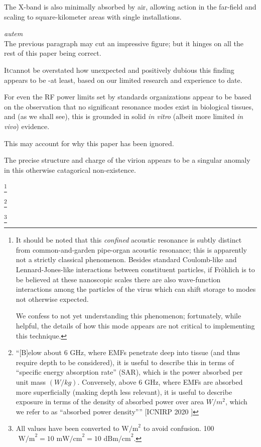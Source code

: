 \documentclass[fleqn,10pt]{article}
\begin{document}
\begin{multicols}{1}
The X-band is also minimally absorbed by air, allowing action in the far-field and scaling to square-kilometer areas with single installations.

\begin{autem}

{\it autem}\\
The previous paragraph may cut an impressive figure; but it hinges on all the rest of this paper being correct.

\end{autem}

\lettrine{It} cannot be overstated how unexpected and positively dubious this finding appears to be -at least, based on our limited research and experience to date.

For even the RF power limits set by standards organizations appear to be based on the observation that no significant resonance modes exist in biological tissues, and (as we shall see), this is grounded in solid {\it in vitro} (albeit more limited {\it in vivo}) evidence. 

This may account for why this paper has been ignored.

The precise structure and charge of the virion appears to be a singular anomaly in this otherwise catagorical non-existence.


\footnote{It should be noted that this {\it confined} acoustic resonance is subtly distinct from common-and-garden pipe-organ acoustic resonance; this is apparently not a strictly classical phenomenon. Besides standard Coulomb-like and Lennard-Jones-like interactions between constituent particles, if Fr\"{o}hlich is to be believed at these nanoscopic scales there are also wave-function interactions among the particles of the virus which can shift storage to modes not otherwise expected.

We confess to not yet understanding this phenomenon; fortunately, while helpful, the details of how this mode appears are not critical to implementing this technique.}

\footnote{``{[B]elow about 6 GHz, where EMFs penetrate deep into tissue (and thus require depth to be considered), it is useful to describe this in terms of “specific energy absorption rate” (SAR), which is the power absorbed per unit mass $(W/kg)$. Conversely, above 6 GHz, where EMFs are absorbed more superficially (making depth less relevant), it is useful to describe exposure in terms of the density of absorbed power over area $W/m^2$, which we refer to as “absorbed power density”}'' [ICNIRP 2020 \faExternalLink] }



\footnote{All values have been converted to $\text{W/m}^2$ to avoid confusion. 100 $\text{ W/m}^2 = 10 \text{ mW/cm}^2 = 10 \text{ dBm/cm}^2$.}



\end{multicols}
\clearpage
\end{document}
